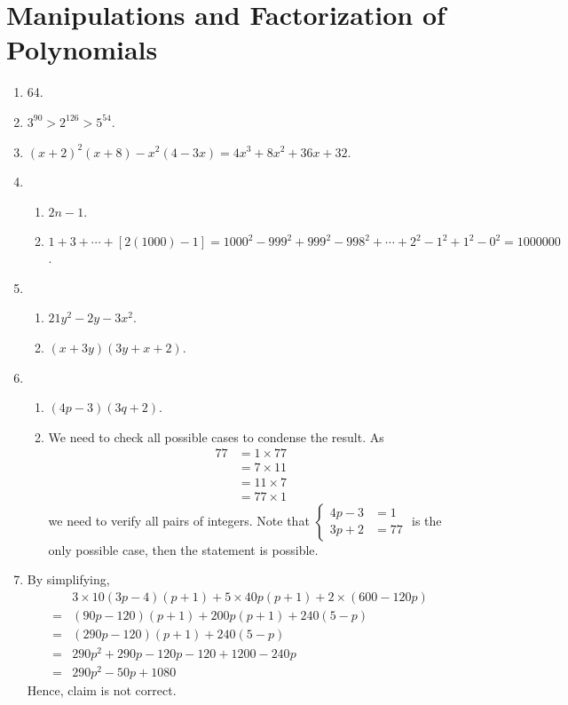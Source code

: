 \documentclass[12pt]{article}
\begin{document}
    \section{Manipulations and Factorization of Polynomials}
    \begin{enumerate}
        \item 64.
        \item $3^{90}>2^{126}>5^{54}$.
        \item $(x+2)^2(x+8) - x^2(4-3x) = 4x^3+8x^2+36x+32$.
        \item \begin{enumerate}
            \item $2n-1$.
            \item $1+3+\cdots+[2(1000)-1] = 1000^2 - 999^2 + 999^2 - 998^2 +\cdots + 2^2 - 1^2 + 1^2 - 0^2 = 1000000$.
        \end{enumerate}
        \item \begin{enumerate}
            \item $21y^2-2y-3x^2$.
            \item $(x+3y)(3y+x+2)$.
        \end{enumerate}
        \item \begin{enumerate}
            \item $(4p-3)(3q+2)$.
            \item We need to check all possible cases to condense the result. As \begin{align*}
                77&=1\times 77\\&=7\times 11\\&=11\times 7\\&=77\times 1
            \end{align*} we need to verify all pairs of integers. Note that $\begin{cases}
                4p-3&=1\\3p+2&=77
            \end{cases}$ is the only possible case, then the statement is possible.
        \end{enumerate}
        \item By simplifying, \begin{align*}
            &3\times 10(3p-4)(p+1) + 5\times 40p(p+1) + 2\times (600-120p)\\
            =&(90p-120)(p+1)+200p(p+1)+240(5-p)\\
            =&(290p-120)(p+1)+240(5-p)\\
            =&290p^2+290p-120p-120+1200-240p\\
            =&290p^2-50p+1080
        \end{align*} Hence, claim is not correct.
    \end{enumerate}
    \newpage
\end{document}
